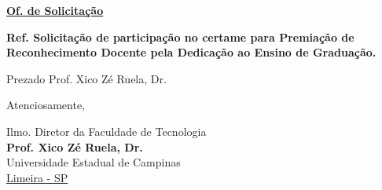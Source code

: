 \documentclass[12pt,a4paper]{oficioft}
\date{\today}
\begin{document}
 \begin{letter}{
     \underline{\textbf{Of. de Solicitação}}%
     
     \textbf{Ref. Solicitação de participação no certame para Premiação de Reconhecimento Docente pela Dedicação ao Ensino de Graduação.} 
}

 \opening{Prezado Prof. Xico Zé Ruela, Dr.}

\lipsum[1-5]

\closing{Atenciosamente,}

\vfill

Ilmo. Diretor da Faculdade de Tecnologia \\
\textbf{Prof. Xico Zé Ruela, Dr.} \\
Universidade Estadual de Campinas \\
\underline{Limeira - SP}
\end{letter}
\end{document}
